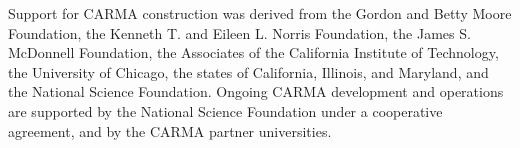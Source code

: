 \acknowledgements Support for CARMA construction was derived from the Gordon and Betty Moore Foundation, the Kenneth T. and Eileen L. Norris Foundation, the James S. McDonnell Foundation, the Associates of the California Institute of Technology, the University of Chicago, the states of California, Illinois, and Maryland, and the National Science Foundation. Ongoing CARMA development and operations are supported by the National Science Foundation under a cooperative agreement, and by the CARMA partner universities.


